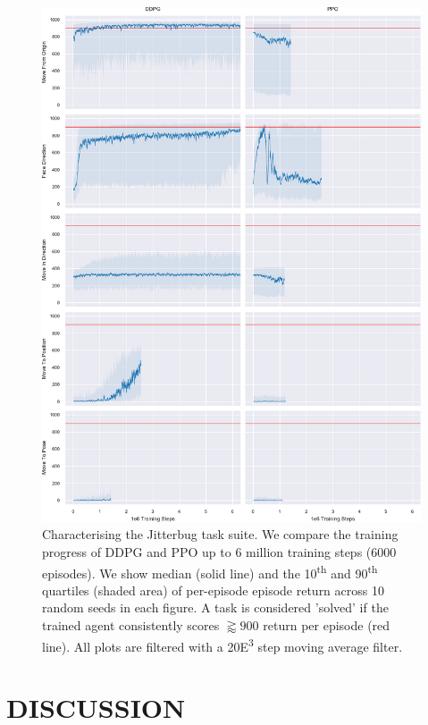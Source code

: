 \documentclass[letterpaper, 10 pt, conference]{ieeeconf}
\begin{document}
\begin{figure}[p]
    
    \centering
    \includegraphics[height=0.94\textheight]{fig-rl-perf}
    
    \caption{
        Characterising the Jitterbug task suite.
        We compare the training progress of DDPG and PPO up to 6 million training steps (6000 episodes).
        We show median (solid line) and the 10\textsuperscript{th} and 90\textsuperscript{th} quartiles (shaded area) of per-episode episode return across 10 random seeds in each figure.
        A task is considered 'solved' if the trained agent consistently scores $\gtrapprox 900$ return per episode (red line).
        All plots are filtered with a 20{\tiny E}\textsuperscript{3} step moving average filter.
    }
    
    \label{fig:rl-perf}
\end{figure}

\section{DISCUSSION}
\end{document}
